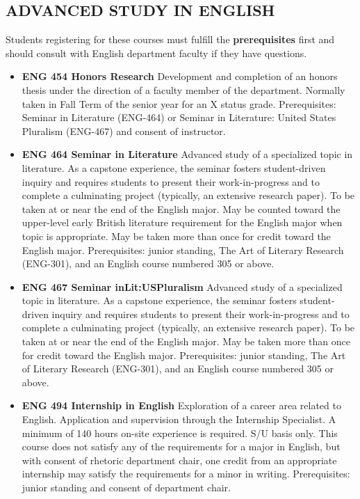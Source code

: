 \documentclass[
  letterpaper,
]{scrbook}
\providecommand{\tightlist}{%
  \setlength{\itemsep}{0pt}\setlength{\parskip}{0pt}}
\begin{document}
\subsection{ADVANCED STUDY IN ENGLISH}\label{advanced-study-in-english}

Students registering for these courses must fulfill the
\textbf{prerequisites} first and should consult with English department
faculty if they have questions.

\begin{itemize}
\tightlist
\item
  \textbf{ENG 454 Honors Research} Development and completion of an
  honors thesis under the direction of a faculty member of the
  department. Normally taken in Fall Term of the senior year for an X
  status grade. Prerequisites: Seminar in Literature (ENG-464) or
  Seminar in Literature: United States Pluralism (ENG-467) and consent
  of instructor.\\
\item
  \textbf{ENG 464 Seminar in Literature} Advanced study of a specialized
  topic in literature. As a capstone experience, the seminar fosters
  student-driven inquiry and requires students to present their
  work-in-progress and to complete a culminating project (typically, an
  extensive research paper). To be taken at or near the end of the
  English major. May be counted toward the upper-level early British
  literature requirement for the English major when topic is
  appropriate. May be taken more than once for credit toward the English
  major. Prerequisites: junior standing, The Art of Literary Research
  (ENG-301), and an English course numbered 305 or above.
\item
  \textbf{ENG 467 Seminar inLit:USPluralism} Advanced study of a
  specialized topic in literature. As a capstone experience, the seminar
  fosters student-driven inquiry and requires students to present their
  work-in-progress and to complete a culminating project (typically, an
  extensive research paper). To be taken at or near the end of the
  English major. May be taken more than once for credit toward the
  English major. Prerequisites: junior standing, The Art of Literary
  Research (ENG-301), and an English course numbered 305 or above.
\item
  \textbf{ENG 494 Internship in English} Exploration of a career area
  related to English. Application and supervision through the Internship
  Specialist. A minimum of 140 hours on-site experience is required. S/U
  basis only. This course does not satisfy any of the requirements for a
  major in English, but with consent of rhetoric department chair, one
  credit from an appropriate internship may satisfy the requirements for
  a minor in writing. Prerequisites: junior standing and consent of
  department chair.
\end{itemize}
\end{document}
